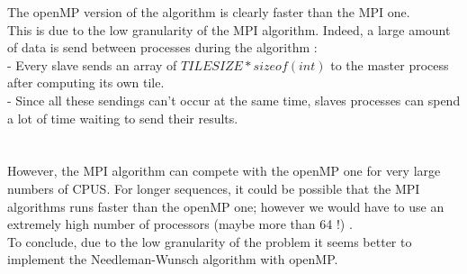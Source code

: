 The openMP version of the algorithm is clearly faster than the MPI one. \\ This is due to the low granularity of the MPI algorithm. Indeed, a large amount of data is send between processes during the algorithm :  \\
- Every slave sends an array of $TILESIZE*sizeof(int)$ to the master process after computing its own tile.  \\
- Since all these sendings can't occur at the same time, slaves processes can spend a lot of time waiting to send their results.\\ \\ \\
However, the MPI algorithm can compete with the openMP one for very large numbers of CPUS. For longer sequences, it could be possible that the MPI algorithms runs faster than the openMP one; however we would have to use an extremely high number of processors (maybe more than 64 !) .\\

To conclude, due to the low granularity of the problem it seems better to implement the Needleman-Wunsch algorithm with openMP.